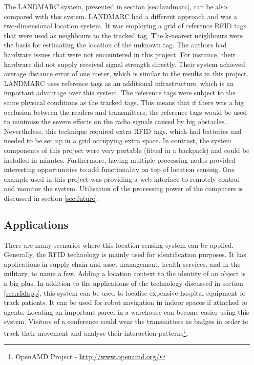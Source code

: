 The LANDMARC system, presented in section \ref{sec:landmarc}, can be also compared with this system. LANDMARC had a different approach and was a two-dimensional location system. It was employing a grid of reference RFID tags that were used as neighbours to the tracked tag. The k-nearest neighbours were the basis for estimating the location of the unknown tag. The authors had hardware issues that were not encountered in this project. For instance, their hardware did not supply received signal strength directly. Their system achieved average distance error of one meter, which is similar to the results in this project. LANDMARC uses reference tags as an additional infrastructure, which is an important advantage over this system. The reference tags were subject to the same physical conditions as the tracked tags. This means that if there was a big occlusion between the readers and transmitters, the reference tags would be used to minimise the severe effects on the radio signals caused by big obstacles. Nevertheless, this technique required extra RFID tags, which had batteries and needed to be set up in a grid occupying extra space. In contrast, the system components of this project were very portable (fitted in a backpack) and could be installed in minutes. Furthermore, having multiple processing nodes provided interesting opportunities to add functionality on top of location sensing. One example used in this project was providing a web interface to remotely control and monitor the system. Utilisation of the processing power of the computers is discussed in section \ref{sec:future}.

\subsection{Applications}

There are many scenarios where this location sensing system can be applied. Generally, the RFID technology is mainly used for identification purposes. It has applications in supply chain and asset management, health services, and in the military, to name a few. Adding a location context to the identity of an object is a big plus. In addition to the applications of the technology discussed in section \ref{sec:rfidapp}, this system can be used to localise expensive hospital equipment or track patients. It can be used for robot navigation in indoor spaces if attached to agents. Locating an important parcel in a warehouse can become easier using this system. Visitors of a conference could wear the transmitters as badges in order to track their movement and analyse their interaction patterns\footnote{OpenAMD Project - \url{http://www.openamd.org/}}.

